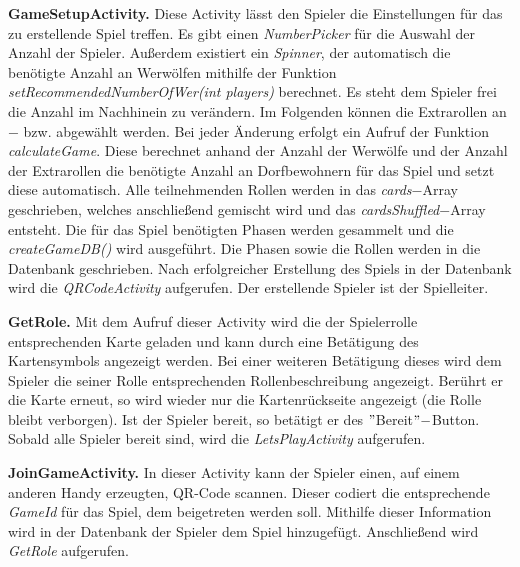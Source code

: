 \documentclass[12pt]{article}
\begin{document}
\vspace{0,3 cm}
      
\textbf{GameSetupActivity.}
Diese Activity lässt den Spieler die Einstellungen für das zu erstellende Spiel treffen.
Es gibt einen \textit{NumberPicker} für die Auswahl der Anzahl der Spieler.
Außerdem existiert ein \textit{Spinner}, der automatisch die benötigte Anzahl an Werwölfen mithilfe der Funktion \textit{setRecommendedNumberOfWer(int players)} berechnet. Es steht dem Spieler frei die Anzahl im Nachhinein zu verändern.
Im Folgenden können die Extrarollen an$-$ bzw. abgewählt werden.
Bei jeder Änderung erfolgt ein Aufruf der Funktion \textit{calculateGame}. Diese berechnet anhand der Anzahl der Werwölfe und der Anzahl der Extrarollen die benötigte Anzahl an Dorfbewohnern für das Spiel und setzt diese automatisch.
Alle teilnehmenden Rollen werden in das \textit{cards}$-$Array geschrieben, welches anschließend gemischt wird
und das \textit{cardsShuffled}$-$Array entsteht.
Die für das Spiel benötigten Phasen werden gesammelt und die \textit{createGameDB()} wird ausgeführt.
Die Phasen sowie die Rollen werden in die Datenbank geschrieben.
Nach erfolgreicher Erstellung des Spiels in der Datenbank wird die \textit{QRCodeActivity} aufgerufen. Der erstellende Spieler ist der Spielleiter.
    
\vspace{0,3 cm}  

\textbf{GetRole.}
Mit dem Aufruf dieser Activity wird die der Spielerrolle entsprechenden Karte geladen und kann durch eine Betätigung des Kartensymbols angezeigt werden. Bei einer weiteren Betätigung dieses wird dem Spieler die seiner Rolle entsprechenden Rollenbeschreibung angezeigt. Berührt er die Karte erneut, so wird wieder nur die Kartenrückseite angezeigt (die Rolle bleibt verborgen). Ist der Spieler bereit, so betätigt er des $"$Bereit$"-$Button. Sobald alle Spieler bereit sind, wird die \textit{LetsPlayActivity} aufgerufen.

\vspace{0,3 cm}      
      
\textbf{JoinGameActivity.}
In dieser Activity kann der Spieler einen, auf einem anderen Handy erzeugten, QR-Code scannen.
Dieser codiert die entsprechende \textit{GameId} für das Spiel, dem beigetreten werden soll.
Mithilfe dieser Information wird in der Datenbank der Spieler dem Spiel hinzugefügt.
Anschließend wird \textit{GetRole} aufgerufen.

\vspace{0,3 cm}
      
\end{document}
